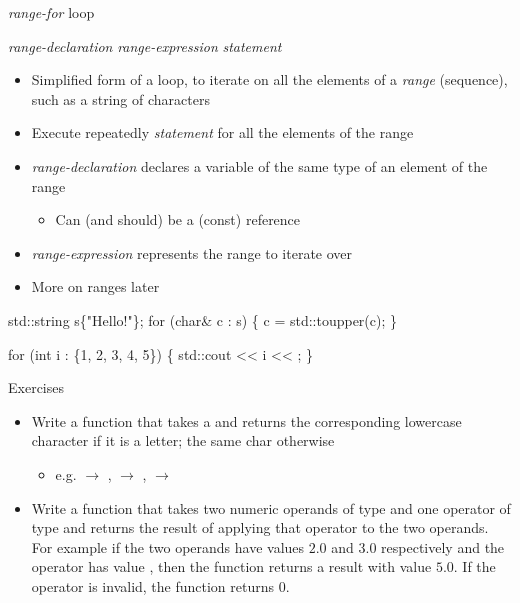 \begin{frame}[fragile]{\textit{range-for} loop}

     \textit{range-declaration} \code{:} \textit{range-expression} \code{)} \textit{statement}

  \begin{itemize}
  \item Simplified form of a  loop, to iterate on all the elements of
    a \textit{range} (sequence), such as a string of characters
  \item<2-> Execute repeatedly \textit{statement} for all the elements of the range
  \item<3-> \textit{range-declaration} declares a variable of the same type of
    an element of the range
    \begin{itemize}
    \item Can (and should) be a (const) reference
    \end{itemize}
  \item<4-> \textit{range-expression} represents the range to iterate over
  \item<5-> More on ranges later
  \end{itemize}

  \begin{codeblock}
std::string s\{"Hello!"\};
for (char& c : s) \{
  c = std::toupper(c); 
\}

for (int i : \{1, 2, 3, 4, 5\}) \{
  std::cout << i << \upquote{ };
\}\end{codeblock}

\end{frame}

\begin{frame}{Exercises}

  \begin{itemize}
  \item Write a function that takes a  and returns the corresponding
    lowercase character if it is a letter; the same char otherwise
    \begin{itemize}
    \item e.g.  $\rightarrow$ ,  $\rightarrow$
      , \upquote{;} $\rightarrow$ \upquote{;}
    \end{itemize}
  \item Write a function that takes two numeric operands of type 
    and one operator of type  and returns the result of applying that
    operator to the two operands. For example if the two operands have values
    $2.0$ and $3.0$ respectively and the operator has value \code{\upquote{+}},
    then the function returns a result with value $5.0$. If the operator is
    invalid, the function returns $0$.
  \end{itemize}
\end{frame}

